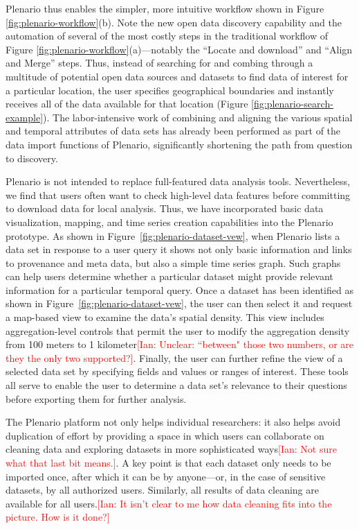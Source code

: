 \documentclass[11pt]{article}
\newcommand{\ian}[1]{\textcolor{Red}{[Ian: #1]}}
\newcommand{\ian}[1]{}
\begin{document}
Plenario thus enables the simpler, more intuitive workflow shown in Figure \ref{fig:plenario-workflow}(b).
Note the new open data discovery capability and the automation of several of the most costly steps in the traditional workflow of Figure \ref{fig:plenario-workflow}(a)---notably the ``Locate and download'' and ``Align and Merge'' steps. Thus, instead of searching for and combing through a multitude of potential open data sources and datasets to find data of interest for a particular location, the user specifies geographical boundaries and instantly receives all of the data available for that location (Figure \ref{fig:plenario-search-example}). The labor-intensive work of combining and aligning the various spatial and temporal attributes of data sets has already been performed as part of the data import functions of Plenario, significantly shortening the path from question to discovery.

Plenario is not intended to replace full-featured data analysis tools. 
Nevertheless, we find that users often want to check high-level data features before committing to download data for local analysis. 
Thus, we have incorporated basic data visualization, mapping, and time series creation capabilities into the Plenario prototype.
As shown in Figure~\ref{fig:plenario-dataset-vew}, when Plenario lists a data set in response to a user query it shows not only basic information and links to provenance and meta data, but also a simple time series graph. Such graphs can help users determine whether a particular dataset might provide relevant information for a particular temporal query. Once a dataset has been identified as shown in Figure~\ref{fig:plenario-dataset-vew}, the user can then select it and request a map-based view to examine the data's  spatial density. This view includes aggregation-level controls that permit the user to modify the aggregation density from 100 meters to 1 kilometer\ian{Unclear: ``between" those two numbers, or are they the only two supported?}. Finally, the user can further refine the view of a selected data set by specifying fields and values or ranges of interest. These tools all serve to enable the user to determine a data set's relevance to their questions before exporting them for further analysis.

The Plenario platform not only helps individual researchers: it also helps avoid duplication of effort by providing a space in which users can collaborate on cleaning data and exploring datasets in more sophisticated ways\ian{Not sure what that last bit means.}. 
A key point is that each dataset only needs to be imported once, after which it can be by anyone---or, in the case of sensitive datasets, by all authorized users.
Similarly, all results of data cleaning are available for all users.\ian{It isn't clear to me how data cleaning fits into the picture. How is it done?}
\end{document}
